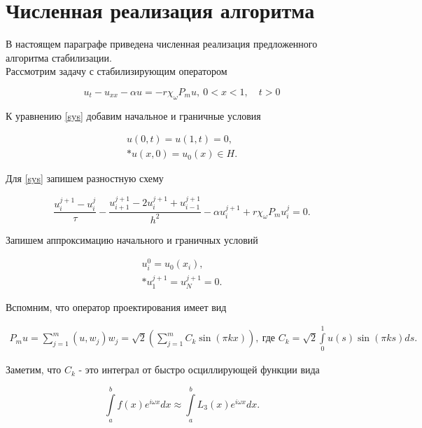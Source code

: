 \section{Численная реализация алгоритма}
\vspace{1em}

В настоящем параграфе приведена численная реализация предложенного алгоритма 
стабилизации.\\

Рассмотрим задачу с стабилизирующим оператором

\begin{equation}\label{sys}
    u_t - u_{xx} - \alpha u = -r\chi_{\omega}P_m u, \ 0 < x < 1, \quad t > 0
\end{equation}

К уравнению \eqref{sys} добавим начальное и граничные условия

\begin{gather}\label{s_control}
    u(0, t) = u(1, t) = 0, \\*
    u(x, 0) = u_{0}(x) \in H. \nonumber
\end{gather}

Для \eqref{sys} запишем разностную схему

\begin{equation}\label{scheme}
    \frac{u^{j + 1}_i - u^j_i}{\tau} - \frac{u_{i + 1}^{j + 1} - 
    2u_{i}^{j + 1} + u_{i - 1}^{j + 1}}{h^2} - \alpha u_{i}^{j + 1} + 
    r\chi_{\omega}P_m u^j_i = 0.
\end{equation}

Запишем аппроксимацию начального и граничных условий

\begin{gather}
    u_i^0 = u_0(x_i), \\*
    u_1^{j+1} = u_N^{j+1} = 0. \nonumber
\end{gather}

Вспомним, что оператор проектирования имеет вид

\begin{gather*}
    P_m u = \sum \limits_{j=1}^{m} {(u, w_j) w_j} = 
    \sqrt{2} (\sum \limits_{j=1}^{m} {C_k \sin{(\pi k x)}}), \ \text{где }
    C_k = \sqrt{2} \int\limits_0^1{u(s)\sin{(\pi k s)} ds}.
\end{gather*}

Заметим, что $C_k$ - это интеграл от быстро осциллирующей функции вида

\begin{equation}
    \int\limits_a^b{f(x) e^{i\omega x} dx} \approx \int\limits_a^b{L_3(x)
    e^{i\omega x} dx}.
\end{equation}

